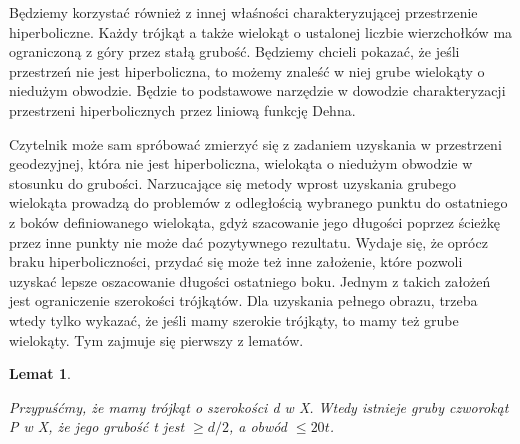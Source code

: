 \documentclass[licencjacka]{pracamgr}
\newtheorem{lemma}{Lemat}[section]
\begin{document}
Będziemy korzystać również z innej właśności charakteryzującej przestrzenie hiperboliczne. Każdy trójkąt a także wielokąt o ustalonej liczbie wierzchołków ma ograniczoną z góry przez stałą grubość. Będziemy chcieli pokazać, że jeśli przestrzeń nie jest hiperboliczna, to możemy znaleść w niej grube wielokąty o niedużym obwodzie. Będzie to podstawowe narzędzie w dowodzie charakteryzacji przestrzeni hiperbolicznych przez liniową funkcję Dehna.

Czytelnik może sam spróbować zmierzyć się z zadaniem uzyskania w przestrzeni geodezyjnej, która nie jest hiperboliczna, wielokąta o niedużym obwodzie w stosunku do grubości. Narzucające się metody wprost uzyskania grubego wielokąta prowadzą do problemów z odległością wybranego punktu do ostatniego z boków definiowanego wielokąta, gdyż szacowanie jego długości poprzez ścieżkę przez inne punkty nie może dać pozytywnego rezultatu. Wydaje się, że oprócz braku hiperboliczności, przydać się może też inne założenie, które pozwoli uzyskać lepsze oszacowanie długości ostatniego boku. Jednym z takich założeń jest ograniczenie szerokości trójkątów. Dla uzyskania pełnego obrazu, trzeba wtedy tylko wykazać, że jeśli mamy szerokie trójkąty, to mamy też grube wielokąty. Tym zajmuje się pierwszy z lematów.

\begin{lemma}\label{lemma:olshanskii_1}

Przypuśćmy, że mamy trójkąt o szerokości d w X. Wtedy istnieje gruby czworokąt P w X, że jego grubość t jest $\geq d/2$, a obwód $\leq 20t$.

\end{lemma}
\end{document}
